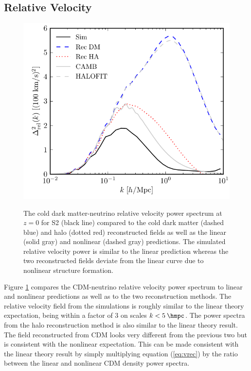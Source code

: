 \subsection{Relative Velocity}
\label{ssec:relvel}

\begin{figure}[!t]
\begin{center}
\includegraphics[width=\smwidth]{./figures/neutrinos/fig8.pdf} \vspace{-0.1cm}
\caption[Simulated and reconstructed cold dark matter-neutrino relative velocity power spectra]
{The cold dark matter-neutrino relative velocity power
spectrum at $z = 0$ for S2 (black line) compared to the cold
dark matter (dashed blue) and halo (dotted red)
reconstructed fields as well as the linear (solid gray) and
nonlinear (dashed gray) predictions.  The simulated
relative velocity power is similar to the linear prediction
whereas the two reconstructed fields deviate from the linear
curve due to nonlinear structure formation.}
\vspace{-0.2cm}
\label{fig:relvelpow}
\end{center}
\end{figure}

Figure \ref{fig:relvelpow} compares the CDM-neutrino relative velocity power spectrum to linear and nonlinear predictions as well as to the two reconstruction methods. The relative velocity field from the simulations is roughly similar to the linear theory expectation, being within a factor of $3$ on scales $k<5\:\hmpc$. The power spectra from the halo reconstruction method is also similar to the linear theory result.  The field reconstructed from CDM looks very different from the previous two but is consistent with the nonlinear expectation. This can be made consistent with the linear theory result by simply multiplying equation (\ref{eq:vrec}) by the ratio between the linear and nonlinear CDM density power spectra.

